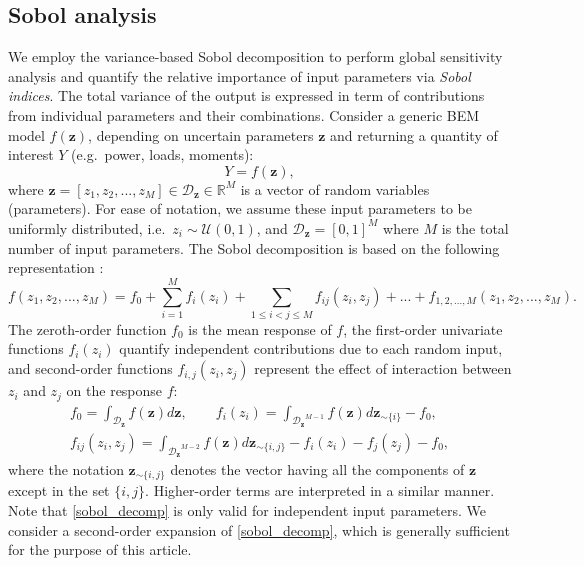 \subsection{Sobol analysis}
We employ the variance-based Sobol decomposition to perform global sensitivity analysis and quantify the relative importance of input parameters via \emph{Sobol indices}. The total variance of the output is expressed in term of contributions from individual parameters and their combinations. Consider a generic BEM model $f(\mathbf{z})$, depending on uncertain parameters $\mathbf{z}$ and returning a quantity of interest $Y$ (e.g.\ power, loads, moments):
\begin{equation}\label{nonlinear_model}
Y = f({\mathbf{z}}),
\end{equation}
where ${\mathbf{z}} = [z_1, z_2, ..., z_M]\in \mathcal{D}_{\mathbf{z}}\in \mathbb{R}^M$ is a vector of random variables (parameters). For ease of notation, we assume these input parameters to be uniformly distributed, i.e.\ $z_i \sim \mathcal{U}(0,1)$, and $\mathcal{D}_{\mathbf{z}} = [0,1]^M$ where $M$ is the total number of input parameters. The Sobol decomposition is based on the following representation \cite{RSmith}:
\begin{equation}\label{sobol_decomp}
f(z_1, z_2, ..., z_M) = f_0+\sum_{i=1}^M f_i(z_i) + \sum_{1\leq i<j\leq M} f_{ij}(z_i,z_j) + ... + f_{1, 2, ..., M}(z_1, z_2, ..., z_M).
\end{equation}
The zeroth-order function $f_0$ is the mean response of $f$, the first-order univariate functions $f_i(z_i)$ quantify independent contributions due to each random input, and second-order functions $f_{i,j}(z_i,z_j)$ represent the effect of interaction between $z_i$ and $z_j$ on the response $f$:
\begin{align}\label{sobol_terms}
f_0 = \int_{\mathcal{D}_{\mathbf{z}}}f(\mathbf{z})d\mathbf{z}, \qquad  f_i(z_i)= \int_{{\mathcal{D}_{\mathbf{z}}}^{M-1}}f(\mathbf{z})d\mathbf{z}_{\sim \{i\}} - f_0,\\
f_{ij}(z_i,z_j) = \int_{{\mathcal{D}_{\mathbf{z}}}^{M-2}}f(\mathbf{z})d\mathbf{z}_{\sim \{i,j\}} - f_i(z_i) - f_j(z_j) - f_0,
\end{align}
where the notation $\mathbf{z}_{\sim \{i,j\}}$ denotes the vector having all the components of $\mathbf{z}$ except in the set $\{i,j\}$. Higher-order terms are interpreted in a similar manner. Note that \eqref{sobol_decomp} is only valid for independent input parameters. We consider a second-order expansion of \eqref{sobol_decomp}, which is generally sufficient for the purpose of this article. 

